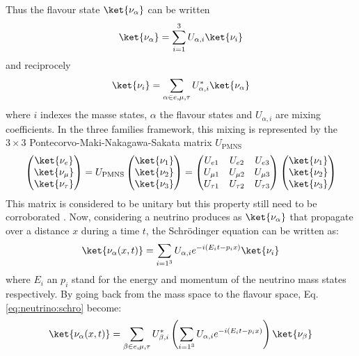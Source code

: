 Thus the flavour state $\ket{\nu_\alpha}$ can be written
\begin{equation}
  \ket{\nu_\alpha} = \sum_{i=1}^3 U_{\alpha, i} \ket{\nu_i}
\end{equation}
and reciprocely
\begin{equation}
  \ket{\nu_i} = \sum_{\alpha \in e,\mu,\tau} U^*_{\alpha, i} \ket{\nu_\alpha}
\end{equation}
where $i$ indexes the masse states, $\alpha$ the flavour states and $U_{\alpha, i}$ are mixing coefficients. In the three families framework, this mixing is represented by the $3 \times 3$ Pontecorvo-Maki-Nakagawa-Sakata matrix \cite{maki_remarks_1962} $U_{\text{PMNS}}$
\begin{equation}
  \begin{pmatrix}
    \ket{\nu_e} \\
    \ket{\nu_\mu} \\
    \ket{\nu_\tau}
  \end{pmatrix} = U_{\text{PMNS}} \begin{pmatrix}
    \ket{\nu_1} \\
    \ket{\nu_2} \\
    \ket{\nu_3}
  \end{pmatrix} = \begin{pmatrix}
  U_{e1} & U_{e2} & U_{e3} \\
  U_{\mu 1} & U_{\mu 2} & U_{\mu 3} \\
  U_{\tau 1} & U_{\tau 2} & U_{\tau 3}
  \end{pmatrix} \begin{pmatrix}
    \ket{\nu_1} \\
    \ket{\nu_2} \\
    \ket{\nu_3}
  \end{pmatrix}
\end{equation}
This matrix is considered to be unitary but this property still need to be corroborated \cite{parke_unitarity_2016}. Now, considering a neutrino produces as $\ket{\nu_\alpha}$ that propagate over a distance $x$ during a time $t$, the Schrödinger equation \cite{schrodinger_undulatory_1926} can be written as:
\begin{equation}
  \label{eq:neutrino:schro}
  \ket{\nu_\alpha(x, t)} = \sum_{i=1^3} U_{\alpha, i} e^{-i(E_it-p_ix)} \ket{\nu_i}
\end{equation}
where $E_i$ an $p_i$ stand for the energy and momentum of the neutrino mass states respectively. By going back from the mass space to the flavour space, Eq. \ref{eq:neutrino:schro} become:
\begin{equation}
  \ket{\nu_\alpha(x, t)} = \sum_{\beta \in e,\mu,\tau} U^*_{\beta, i} \left( \sum_{i=1^3} U_{\alpha, i} e^{-i(E_it-p_ix)} \right) \ket{\nu_\beta}
\end{equation}

